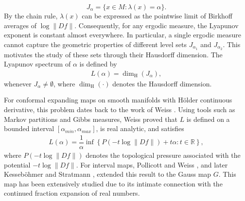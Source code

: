 \documentclass[11pt]{amsart}
\theoremstyle{remark}
\numberwithin{equation}{section}
\newcommand{\R}{\mathbb{R}}
\begin{document}
$$J_{\alpha}=\{x\in M: \lambda(x)=\alpha\}.$$ 
By the chain rule, $\lambda(x)$ can be expressed as the pointwise limit of Birkhoff averages of $\log \|Df\|$. Consequently, for any ergodic measure, the Lyapunov exponent is constant almost everywhere. In particular, a single ergodic measure cannot capture the geometric properties of different level sets $J_{\alpha_1}$ and $J_{\alpha_2}$. This motivates the study of these sets through their Hausdorff dimension. The Lyapunov spectrum of $\alpha$ is defined by
\begin{align*}
    L(\alpha)=\dim_{\mathrm{H}}\left(J_{\alpha}\right),
\end{align*} whenever $J_{\alpha}\neq \emptyset$, where $\dim_{\mathrm{H}}(\cdot)$ denotes the Hausdorff dimension. 

For conformal expanding maps on smooth manifolds with H\"older continuous derivative, this problem dates back to the work of Weiss  \cite{we}. Using tools such as Markov partitions and Gibbs measures, Weiss proved that $L$ is defined on a bounded interval $\left[\alpha_{min},\alpha_{max}\right]$, is real analytic, and satisfies
\begin{align}\label{EcuWeiss}
    L(\alpha)=\dfrac{1}{\alpha}\inf\left\{P\left(-t\log\|Df\|\right)+t\alpha:t\in \R\right\},
\end{align} 
where $P(-t\log\|Df\|)$ denotes the topological pressure associated with the potential $-t\log\|Df\|$.
For interval maps, Pollicott and Weiss \cite{mh}, and later  Kesseb\"ohmer and Stratmann \cite{kessestrat}, extended this result to the Gauss map $G$. This map has been extensively studied due to its intimate connection with the continued fraction expansion of real numbers.
\end{document}
